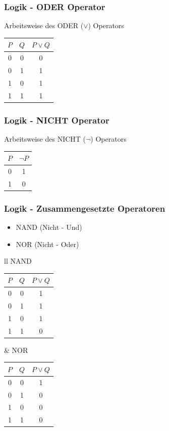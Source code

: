 \documentclass{beamer}
\begin{document}
\frame
{
	\frametitle{Logik - ODER Operator}
	Arbeitsweise des ODER ($\lor$) Operators\\
	\vspace{3mm}
	\begin{tabular}{c|c|c}
	$P$ & $Q$ & $P \lor Q$ \\
	\hline
	0 & 0 & 0 \\
	0 & 1 & 1 \\
	1 & 0 & 1 \\
	1 & 1 & 1
	\end{tabular}
}

\frame
{
	\frametitle{Logik - NICHT Operator}
	Arbeitsweise des NICHT ($\lnot$) Operators\\
	\vspace{3mm}
	\begin{tabular}{c|c}
	$P$ & $\lnot P$ \\
	\hline
	0 & 1 \\
	1 & 0
	\end{tabular}
}

\frame
{
	\frametitle{Logik - Zusammengesetzte Operatoren}
	\begin{itemize}
    \item NAND (Nicht - Und)
    \item NOR (Nicht - Oder)
    \end{itemize}
    \begin{tabular}{ll}
    NAND
    \begin{tabular}{c|c|c}
	$P$ & $Q$ & $P \lor Q$ \\
	\hline
	0 & 0 & 1 \\
	0 & 1 & 1 \\
	1 & 0 & 1 \\
	1 & 1 & 0
	\end{tabular}
    &
    NOR
    \begin{tabular}{c|c|c}
	$P$ & $Q$ & $P \lor Q$ \\
	\hline
	0 & 0 & 1 \\
	0 & 1 & 0 \\
	1 & 0 & 0 \\
	1 & 1 & 0
	\end{tabular}
    \end{tabular}
}
\end{document}
